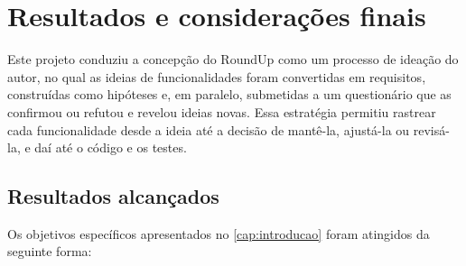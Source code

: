 
\chapter{Resultados e considerações finais}
\label{cap:resultados}

Este projeto conduziu a concepção do RoundUp como um processo de
ideação do autor, no qual as ideias de funcionalidades foram convertidas
em requisitos, construídas como hipóteses e, em paralelo, submetidas a um
questionário que as confirmou ou refutou e revelou ideias novas. Essa
estratégia permitiu rastrear cada funcionalidade desde a ideia até a
decisão de mantê-la, ajustá-la ou revisá-la, e daí até o código e os
testes.

\section{Resultados alcançados}

Os objetivos específicos apresentados no \autoref{cap:introducao} foram
atingidos da seguinte forma:

